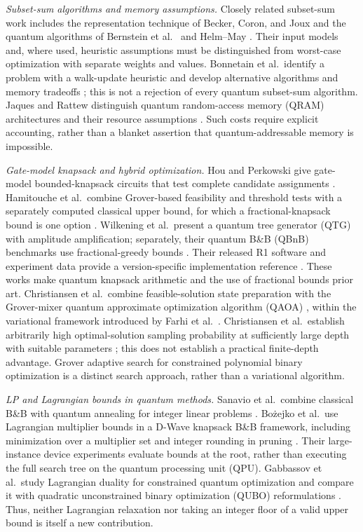 \documentclass[referee,pdflatex,sn-mathphys-num]{sn-jnl}
\theoremstyle{thmstyleone}
\theoremstyle{thmstyletwo}
\begin{document}
\textit{Subset-sum algorithms and memory assumptions.} Closely related subset-sum work includes the representation technique of Becker, Coron, and Joux \cite{ref5} and the quantum algorithms of Bernstein et al.\ \cite{ref16} and Helm--May \cite{ref17}. Their input models and, where used, heuristic assumptions must be distinguished from worst-case optimization with separate weights and values. Bonnetain et al.\ identify a problem with a walk-update heuristic and develop alternative algorithms and memory tradeoffs \cite{bonnetain2020improved}; this is not a rejection of every quantum subset-sum algorithm. Jaques and Rattew distinguish quantum random-access memory (QRAM) architectures and their resource assumptions \cite{ref18}. Such costs require explicit accounting, rather than a blanket assertion that quantum-addressable memory is impossible.

\textit{Gate-model knapsack and hybrid optimization.} Hou and Perkowski give gate-model bounded-knapsack circuits that test complete candidate assignments \cite{hou2020}. Hamitouche et al.\ combine Grover-based feasibility and threshold tests with a separately computed classical upper bound, for which a fractional-knapsack bound is one option \cite{hamitouche2025}. Wilkening et al.\ present a quantum tree generator (QTG) with amplitude amplification; separately, their quantum B\&B (QBnB) benchmarks use fractional-greedy bounds \cite{wilkening2025}. Their released R1 software and experiment data provide a version-specific implementation reference \cite{wilkening2025code}. These works make quantum knapsack arithmetic and the use of fractional bounds prior art. Christiansen et al.\ combine feasible-solution state preparation with the Grover-mixer quantum approximate optimization algorithm (QAOA) \cite{ref23}, within the variational framework introduced by Farhi et al.\ \cite{ref25}. Christiansen et al.\ establish arbitrarily high optimal-solution sampling probability at sufficiently large depth with suitable parameters \cite{ref23}; this does not establish a practical finite-depth advantage. Grover adaptive search for constrained polynomial binary optimization \cite{ref26} is a distinct search approach, rather than a variational algorithm.

\textit{LP and Lagrangian bounds in quantum methods.} Sanavio et al.\ combine classical B\&B with quantum annealing for integer linear problems \cite{ref36}. Bo\.{z}ejko et al.\ use Lagrangian multiplier bounds in a D-Wave knapsack B\&B framework, including minimization over a multiplier set and integer rounding in pruning \cite{bozejko2026}. Their large-instance device experiments evaluate bounds at the root, rather than executing the full search tree on the quantum processing unit (QPU). Gabbassov et al.\ study Lagrangian duality for constrained quantum optimization and compare it with quadratic unconstrained binary optimization (QUBO) reformulations \cite{gabbassov2025}. Thus, neither Lagrangian relaxation nor taking an integer floor of a valid upper bound is itself a new contribution.
\end{document}
